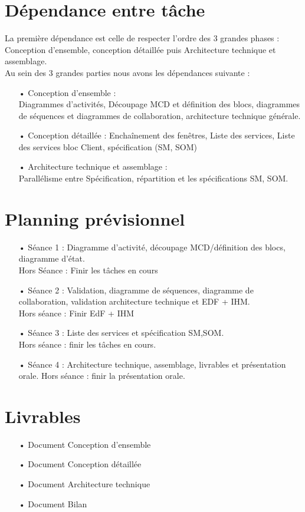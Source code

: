\section{Dépendance entre tâche}
La première dépendance est celle de respecter l'ordre des 3 grandes phases : Conception d'ensemble, conception détaillée puis Architecture technique et assemblage.\\
Au sein des 3 grandes parties nous avons les dépendances suivante : 
\begin{itemize}
\item[•]Conception d'ensemble : \\Diagrammes d'activités, Découpage MCD et définition des blocs, diagrammes de séquences et diagrammes de collaboration, architecture technique générale.

\item[•]Conception détaillée : Enchaînement des fenêtres, Liste des services, Liste des services bloc Client, spécification (SM, SOM)

\item[•]Architecture technique et assemblage :\\
Parallélisme entre Spécification, répartition et les spécifications SM, SOM.

\end{itemize}

\section{Planning prévisionnel}
\begin{itemize}
\item[•]Séance 1 : Diagramme d'activité, découpage MCD/définition des blocs, diagramme d'état.\\
Hors Séance : Finir les tâches en cours
\item[•]Séance 2 : Validation, diagramme de séquences, diagramme de collaboration, validation architecture technique et EDF + IHM.\\
Hors séance : Finir EdF + IHM
\item[•] Séance 3 : Liste des services et spécification SM,SOM.\\
Hors séance : finir les tâches en cours.
\item[•] Séance 4 : Architecture technique, assemblage, livrables et présentation orale.
Hors séance : finir la présentation orale.
\end{itemize}

\section{Livrables}
\begin{itemize}
\item[•]Document Conception d'ensemble
\item[•]Document Conception détaillée
\item[•]Document Architecture technique
\item[•]Document Bilan
\end{itemize}

